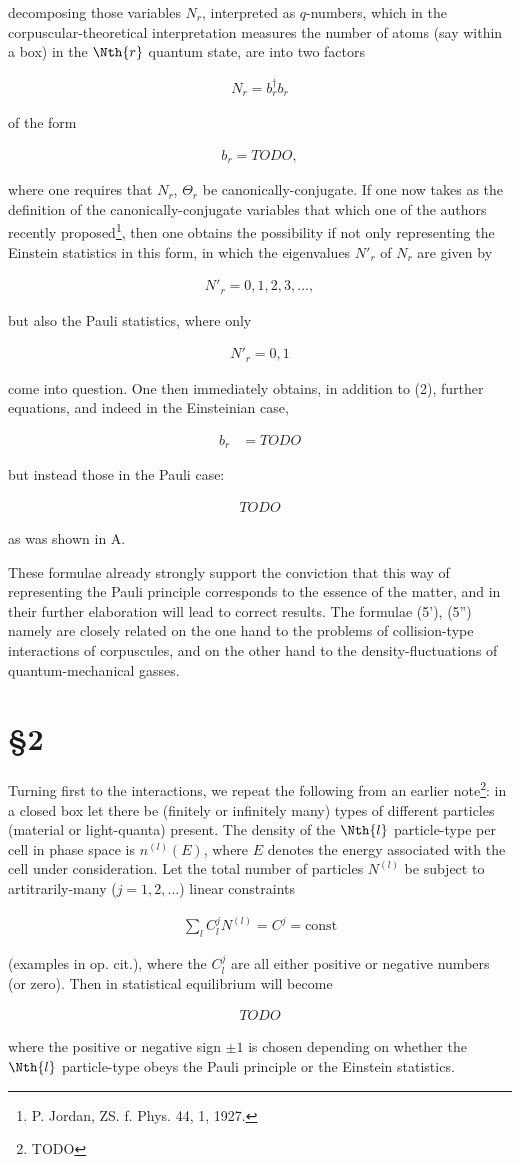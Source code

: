 \documentclass{article}
\newcommand{\nequ}[2]{
\begin{align*}
#1
\tag{#2}
\end{align*}
}
\newcommand{\sumX}[1]{\underset{#1}{\sum}}
\begin{document}
 decomposing those variables $N_r$, interpreted as $q$-numbers, which in the corpuscular-theoretical interpretation measures the number of atoms (say within a box) in the $\Nth{r}$ quantum state, are into two factors
\nequ{
N_r = b_r^\dagger b_r
}{1}
of the form
\nequ{
b_r = TODO,
}{2}
where one requires that $N_r$, $\Theta_r$ be canonically-conjugate. If one now takes as the definition of the canonically-conjugate variables that which one of the authors recently proposed\footnote{P. Jordan, ZS. f. Phys. 44, 1, 1927.}, then one obtains the possibility if not only representing the Einstein statistics in this form, in which the eigenvalues $N'_r$ of $N_r$ are given by
\nequ{
N'_r=0,1,2,3,...,
}{3}
but also the Pauli statistics, where only
\nequ{
N'_r=0,1
}{4}
come into question. One then immediately obtains, in addition to (2), further equations, and indeed in the Einsteinian case,
\nequ{
b_r &= TODO
}{5'}
but instead those in the Pauli case:
\nequ{
TODO
}{5''}
as was shown in A.

These formulae already strongly support the conviction that this way of representing the Pauli principle corresponds to the essence of the matter, and in their further elaboration will lead to correct results. The formulae (5'), (5'') namely are closely related on the one hand to the problems of collision-type interactions of corpuscules, and on the other hand to the density-fluctuations of quantum-mechanical gasses.

\section*{§2}
Turning first to the interactions, we repeat the following from an earlier note\footnote{TODO}: in a closed box let there be (finitely or infinitely many) types of different particles (material or light-quanta) present. The density of the $\Nth{l}$ particle-type per cell in phase space is $n^{(l)}(E)$, where $E$ denotes the energy associated with the cell under consideration. Let the total number of particles $N^{(l)}$ be subject to artitrarily-many ($j=1,2,...$) linear constraints
\nequ{
\sumX{l}C^j_l N^{(l)} = C^j = \text{const}
}{6}
(examples in op. cit.), where the $C^j_l$ are all either positive or negative numbers (or zero). Then in statistical equilibrium will become
\nequ{
TODO
}{7}
where the positive or negative sign $\pm 1$ is chosen depending on whether the $\Nth{l}$ particle-type obeys the Pauli principle or the Einstein statistics.
\end{document}
